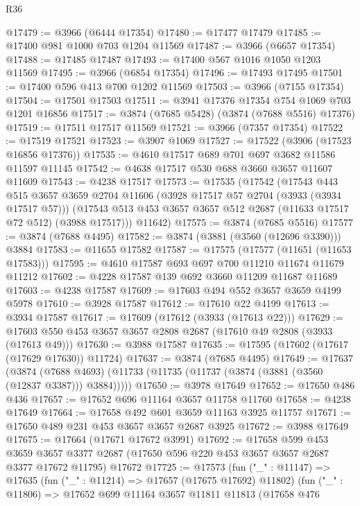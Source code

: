 \begin{lexlean}{R36}
\begin{coremodule}
@17479 := @3966 (@6444 @17354)
@17480 := @17477 @17479
@17485 := @17400 @981 @1000 @703 @1204 @11569
@17487 := @3966 (@6657 @17354)
@17488 := @17485 @17487
@17493 := @17400 @567 @1016 @1050 @1203 @11569
@17495 := @3966 (@6854 @17354)
@17496 := @17493 @17495
@17501 := @17400 @596 @413 @700 @1202 @11569
@17503 := @3966 (@7155 @17354)
@17504 := @17501 @17503
@17511 := @3941 @17376 @17354 @754 @1069 @703 @1201 @16856
@17517 := @3874 (@7685 @5428) (@3874 (@7688 @5516) @17376)
@17519 := @17511 @17517 @11569
@17521 := @3966 (@7357 @17354)
@17522 := @17519 @17521
@17523 := @3907 @1069
@17527 := @17522 (@3906 (@17523 @16856 @17376))
@17535 := @4610 @17517 @689 @701 @697 @3682 @11586 @11597 @11145
@17542 := @4638 @17517 @530 @688 @3660 @3657 @11607 @11609
@17543 := @4238 @17517
@17573 := @17535
    (@17542
      (@17543
        @443
        @515
        @3657
        @3659
        @2704
        @11606
        (@3928 @17517 @57 @2704 (@3933 (@3934 @17517 @57)))
        (@17543 @513 @453 @3657 @3657 @512 @2687 (@11633 @17517 @72 @512) (@3988 @17517)))
      @11642)
@17575 := @3874 (@7685 @5516)
@17577 := @3874 (@7688 @4495)
@17582 := @3874 (@3881 (@3560 (@12696 @3390))) @3884
@17583 := @11655 @17582
@17587 := @17575 (@17577 (@11651 (@11653 @17583)))
@17595 := @4610 @17587 @693 @697 @700 @11210 @11674 @11679 @11212
@17602 := @4228 @17587 @139 @692 @3660 @11209 @11687 @11689
@17603 := @4238 @17587
@17609 := @17603 @494 @552 @3657 @3659 @4199 @5978
@17610 := @3928 @17587
@17612 := @17610 @22 @4199
@17613 := @3934 @17587
@17617 := @17609 (@17612 (@3933 (@17613 @22)))
@17629 := @17603 @550 @453 @3657 @3657 @2808 @2687 (@17610 @49 @2808 (@3933 (@17613 @49)))
@17630 := @3988 @17587
@17635 := @17595 (@17602 (@17617 (@17629 @17630)) @11724)
@17637 := @3874 (@7685 @4495)
@17649 := @17637
    (@3874 (@7688 @4693) (@11733 (@11735 (@11737 (@3874 (@3881 (@3560 (@12837 @3387))) @3884)))))
@17650 := @3978 @17649
@17652 := @17650 @486 @436
@17657 := @17652 @696 @11164 @3657 @11758 @11760
@17658 := @4238 @17649
@17664 := @17658 @492 @601 @3659 @11163 @3925 @11757
@17671 := @17650 @489 @231 @453 @3657 @3657 @2687 @3925
@17672 := @3988 @17649
@17675 := @17664 (@17671 @17672 @3991)
@17692 := @17658
    @599
    @453
    @3659
    @3657
    @3377
    @2687
    (@17650 @596 @220 @453 @3657 @3657 @2687 @3377 @17672 @11795)
    @17672
@17725 := @17573
    (fun ("_" : @11147) =>
    @17635
      (fun ("_" : @11214) => @17657 (@17675 @17692) @11802)
      (fun ("_" : @11806) =>
      @17652
        @699
        @11164
        @3657
        @11811
        @11813
        (@17658
          @476

\end{coremodule}
\end{lexlean}
